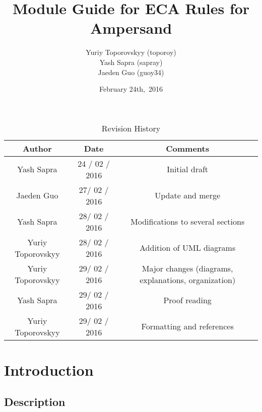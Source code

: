 \documentclass[12pt, svgnames]{article}
\let\Oldsubsection\subsection
\renewcommand{\subsection}{\FloatBarrier\Oldsubsection}
\begin{document}
\title{\vspace*{3cm} Module Guide for ECA Rules for Ampersand} 
\author{Yuriy Toporovskyy (toporoy)\\ Yash Sapra (sapray) \\ Jaeden Guo (guoy34)}
\date{February 24th,\ 2016} 


\maketitle
\newpage
\vspace*{1cm}
\begin{table}[ht!]\begin{center}
        \caption{Revision History}  
        \begin{tabular}{|c|c|c|}\hline
            \textbf{Author} & \textbf{Date} & \textbf{Comments} \\\hline 
            Yash Sapra & 24 / 02 / 2016 & Initial draft\\\hline
	 Jaeden Guo & 27/ 02 / 2016 & Update and merge \\\hline
	 Yash Sapra & 28/ 02 / 2016 & Modifications to several sections \\\hline
	 Yuriy Toporovskyy & 28/ 02 / 2016 & Addition of UML diagrams \\\hline
	 Yuriy Toporovskyy & 29/ 02 / 2016 & Major changes (diagrams, explanations, organization) \\\hline
	 Yash Sapra & 29/ 02 / 2016 & Proof reading \\\hline
	 Yuriy Toporovskyy & 29/ 02 / 2016 & Formatting and references \\\hline
        \end{tabular}
    \end{center}\end{table}
\newpage

\tableofcontents

\newpage

\section{Introduction}\label{intro}
\subsection{Description}
\end{document}

